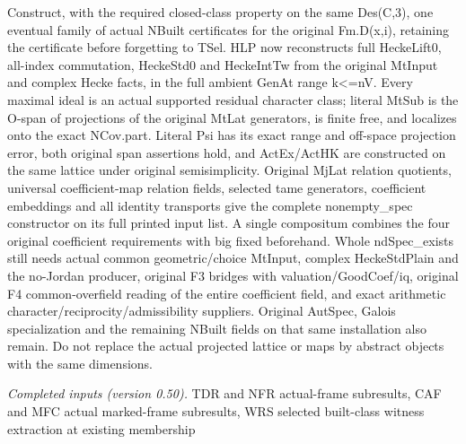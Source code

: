 Construct, with the required closed-class property on the same Des(C,3), one eventual family of actual NBuilt certificates for the original Fm.D(x,i), retaining the certificate before forgetting to TSel. HLP now reconstructs full HeckeLift0, all-index commutation, HeckeStd0 and HeckeIntTw from the original MtInput and complex Hecke facts, in the full ambient GenAt range k<=nV. Every maximal ideal is an actual supported residual character class; literal MtSub is the O-span of projections of the original MtLat generators, is finite free, and localizes onto the exact NCov.part. Literal Psi has its exact range and off-space projection error, both original span assertions hold, and ActEx/ActHK are constructed on the same lattice under original semisimplicity. Original MjLat relation quotients, universal coefficient-map relation fields, selected tame generators, coefficient embeddings and all identity transports give the complete nonempty\_\allowbreak spec constructor on its full printed input list. A single compositum combines the four original coefficient requirements with big fixed beforehand. Whole ndSpec\_\allowbreak exists still needs actual common geometric/choice MtInput, complex HeckeStdPlain and the no-Jordan producer, original F3 bridges with valuation/GoodCoef/iq, original F4 common-overfield reading of the entire coefficient field, and exact arithmetic character/reciprocity/admissibility suppliers. Original AutSpec, Galois specialization and the remaining NBuilt fields on that same installation also remain. Do not replace the actual projected lattice or maps by abstract objects with the same dimensions.

\emph{Completed inputs (version 0.50).} TDR and NFR actual-frame subresults, CAF and MFC actual marked-frame subresults, WRS selected built-class witness extraction at existing membership

